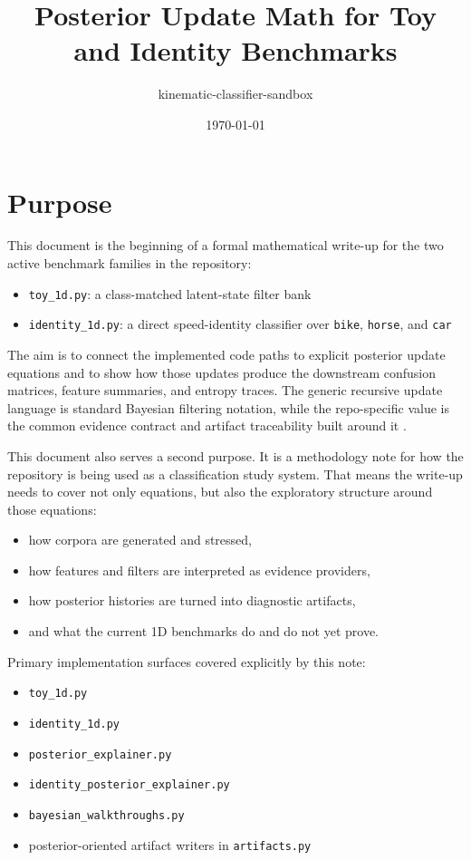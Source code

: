 \documentclass[11pt]{article}
\title{Posterior Update Math for Toy and Identity Benchmarks}
\author{kinematic-classifier-sandbox}
\date{\today}
\begin{document}
\maketitle

\section{Purpose}

This document is the beginning of a formal mathematical write-up for the two
active benchmark families in the repository:
\begin{itemize}[leftmargin=1.5em]
    \item \texttt{toy\_1d.py}: a class-matched latent-state filter bank
    \item \texttt{identity\_1d.py}: a direct speed-identity classifier over
    \texttt{bike}, \texttt{horse}, and \texttt{car}
\end{itemize}

The aim is to connect the implemented code paths to explicit posterior update
equations and to show how those updates produce the downstream confusion
matrices, feature summaries, and entropy traces. The generic recursive update
language is standard Bayesian filtering notation, while the repo-specific value
is the common evidence contract and artifact traceability built around it
\cite{bishop2006,kalman1960}.

This document also serves a second purpose. It is a methodology note for how
the repository is being used as a classification study system. That means the
write-up needs to cover not only equations, but also the exploratory structure
around those equations:
\begin{itemize}[leftmargin=1.5em]
    \item how corpora are generated and stressed,
    \item how features and filters are interpreted as evidence providers,
    \item how posterior histories are turned into diagnostic artifacts,
    \item and what the current 1D benchmarks do and do not yet prove.
\end{itemize}

Primary implementation surfaces covered explicitly by this note:
\begin{itemize}[leftmargin=1.5em]
    \item \texttt{toy\_1d.py}
    \item \texttt{identity\_1d.py}
    \item \texttt{posterior\_explainer.py}
    \item \texttt{identity\_posterior\_explainer.py}
    \item \texttt{bayesian\_walkthroughs.py}
    \item posterior-oriented artifact writers in \texttt{artifacts.py}
\end{itemize}
\end{document}

